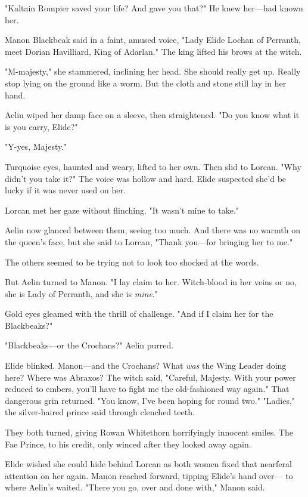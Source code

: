 "Kaltain Rompier saved your life?
And gave you that?"
He knew her---had known her.

Manon Blackbeak said in a faint, amused voice, "Lady Elide Lochan of Perranth, meet Dorian Havilliard, King of Adarlan."
The king lifted his brows at the witch.

"M-majesty," she stammered, inclining her head.
She should really get up.
Really stop lying on the ground like a worm.
But the cloth and stone still lay in her hand.

Aelin wiped her damp face on a sleeve, then straightened.
"Do you know what it is you carry, Elide?"

"Y-yes, Majesty."

Turquoise eyes, haunted and weary, lifted to her own.
Then slid to Lorcan.
"Why didn't you take it?"
The voice was hollow and hard.
Elide suspected she'd be lucky if it was never used on her.

Lorcan met her gaze without flinching.
"It wasn't mine to take."

Aelin now glanced between them, seeing too much.
And there was no warmth on the queen's face, but she said to Lorcan, "Thank you---for bringing her to me."

The others seemed to be trying not to look too shocked at the words.

But Aelin turned to Manon.
"I lay claim to her.
Witch-blood in her veins or no, she is Lady of Perranth, and she is \emph{mine}."

Gold eyes gleamed with the thrill of challenge.
"And if I claim her for the Blackbeaks?"

"Blackbeaks---or the Crochans?"
Aelin purred.

Elide blinked.
Manon---and the Crochans?
What \emph{was} the Wing Leader doing here?
Where was Abraxos?
The witch said, "Careful, Majesty.
With your power reduced to embers, you'll have to fight me the old-fashioned way again."
That dangerous grin returned.
"You know, I've been hoping for round two."
"Ladies," the silver-haired prince said through clenched teeth.

They both turned, giving Rowan Whitethorn horrifyingly innocent smiles.
The Fae Prince, to his credit, only winced after they looked away again.

Elide wished she could hide behind Lorcan as both women fixed that nearferal attention on her again.
Manon reached forward, tipping Elide's hand over--- to where Aelin's waited.
"There you go, over and done with," Manon said.

